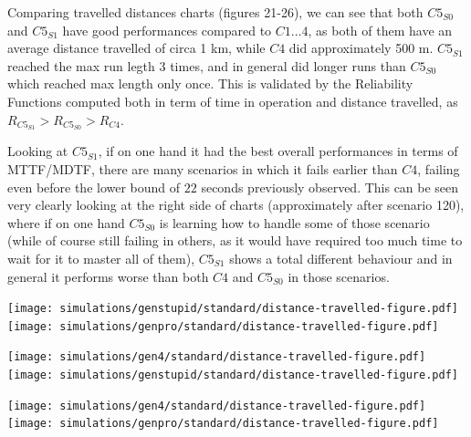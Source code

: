 \vspace{0.8cm}


Comparing travelled distances charts (figures 21-26), we can see that both $C5_{S0}$ and $C5_{S1}$ have good performances compared to $C1\dots 4$, as both of them have an average distance travelled of circa 1 km, while $C4$ did approximately 500 m. $C5_{S1}$ reached the max run legth 3 times, and in general did longer runs than $C5_{S0}$ which reached max length only once.
This is validated by the Reliability Functions computed both in term of time in operation and distance travelled, as $R_{C5_{S1}} > R_{C5_{S0}} > R_{C4}$.

Looking at $C5_{S1}$, if on one hand it had the best overall performances in terms of MTTF/MDTF, there are many scenarios in which it fails earlier than $C4$, failing even before the lower bound of $22$ seconds previously observed. This can be seen very clearly looking at the right side of charts (approximately after scenario 120), where if on one hand $C5_{S0}$ is learning how to handle some of those scenario (while of course still failing in others, as it would have required too much time to wait for it to master all of them), $C5_{S1}$ shows a total different behaviour and in general it performs worse than both $C4$ and $C5_{S0}$ in those scenarios.


\begin{minipage}[c]{\textwidth}
	\texttt{[image: simulations/genstupid/standard/distance-travelled-figure.pdf]}
	\vspace{0.5cm}
	\texttt{[image: simulations/genpro/standard/distance-travelled-figure.pdf]}
\end{minipage}

\begin{minipage}[c]{\textwidth}
	\texttt{[image: simulations/gen4/standard/distance-travelled-figure.pdf]}
	\vspace{0.5cm}
	\texttt{[image: simulations/genstupid/standard/distance-travelled-figure.pdf]}
\end{minipage}

\begin{minipage}[c]{\textwidth}
	\texttt{[image: simulations/gen4/standard/distance-travelled-figure.pdf]}
	\vspace{0.5cm}
	\texttt{[image: simulations/genpro/standard/distance-travelled-figure.pdf]}
\end{minipage}


